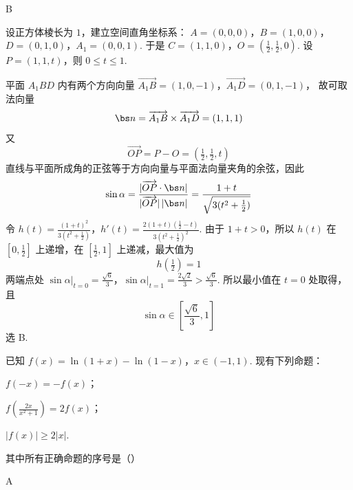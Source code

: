 \begin{answer}
B
\end{answer}

\begin{solution}
设正方体棱长为 \(1\)，建立空间直角坐标系：
\(A=(0,0,0)\)，\(B=(1,0,0)\)，\(D=(0,1,0)\)，\(A_1=(0,0,1)\).
于是
\(C=(1,1,0)\)，\(O=(\tfrac12,\tfrac12,0)\).
设 \(P=(1,1,t)\)，则 \(0\leqslant t\leqslant1\).

平面 \(A_1BD\) 内有两个方向向量
\(\overrightarrow{A_1B}=(1,0,-1)\)，\(\overrightarrow{A_1D}=(0,1,-1)\)，
故可取法向量
\[
\bs n=\overrightarrow{A_1B}\times\overrightarrow{A_1D}=(1,1,1)
\]
又
\[
\overrightarrow{OP}=P-O=(\tfrac12,\tfrac12,t)
\]
直线与平面所成角的正弦等于方向向量与平面法向量夹角的余弦，因此
\[
\sin\alpha=\frac{|\overrightarrow{OP}\cdot\bs n|}{|\overrightarrow{OP}|\,|\bs n|}=\frac{1+t}{\sqrt{3(t^2+\frac12)}}
\]
令
\(h(t)=\frac{(1+t)^2}{3(t^2+\frac12)}\)，\(h'(t)=\frac{2(1+t)(\frac12-t)}{3(t^2+\frac12)^2}\).
由于 \(1+t>0\)，所以 \(h(t)\) 在 \([0,\frac12]\) 上递增，在 \([\frac12,1]\) 上递减，最大值为
\[
h(\tfrac12)=1
\]
两端点处
\(\sin\alpha\big|_{t=0}=\frac{\sqrt6}{3}\)，\(\sin\alpha\big|_{t=1}=\frac{2\sqrt2}{3}>\frac{\sqrt6}{3}\).
所以最小值在 \(t=0\) 处取得，且
\[
\sin\alpha\in\left[\frac{\sqrt6}{3},1\right]
\]
选 B.
\end{solution}

\begin{problem}
已知 \(f(x) = \ln (1 + x) - \ln (1 - x)\)，\(x \in (-1, 1)\). 现有下列命题：

\begin{circlelist}
\item \( f(-x) = -f(x) \)；
\item \( f\left(\frac{2x}{x^{2}+1}\right) = 2f(x) \)；
\item \( |f(x)| \geqslant 2|x| \).
\end{circlelist}

其中所有正确命题的序号是（\quad）

\choices
    {}
    {}
    {}
    {}
\end{problem}

\begin{answer}
A
\end{answer}

